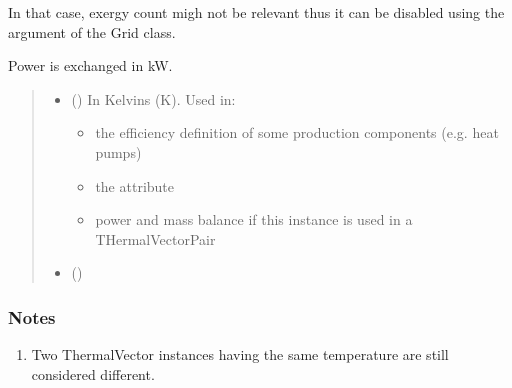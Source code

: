 \documentclass[letterpaper,10pt,english]{sphinxmanual}
\begin{document}
\begin{fulllineitems}
\begin{fulllineitems}
\begin{itemize}
\sphinxAtStartPar
In that case, exergy count migh not be relevant thus it can be disabled using the  argument of the Grid
class.

\end{itemize}

\sphinxAtStartPar
Power is exchanged in kW.
\begin{quote}\begin{description}
\begin{itemize}
\item {} 
\sphinxAtStartPar
{} (\sphinxstyleliteralemphasis{\sphinxupquote{, }}) \textendash{} 
\sphinxAtStartPar
In Kelvins (K).
Used in:
\begin{itemize}
\item {} 
\sphinxAtStartPar
the efficiency definition of some production components (e.g. heat pumps)

\item {} 
\sphinxAtStartPar
the  attribute

\item {} 
\sphinxAtStartPar
power and mass balance if this instance is used in a THermalVectorPair

\end{itemize}


\item {} 
\sphinxAtStartPar
{} (\sphinxstyleliteralemphasis{\sphinxupquote{, }}) \textendash{} 

\end{itemize}

\end{description}\end{quote}
\subsubsection*{Notes}
\begin{enumerate}
%
\item {} 
\sphinxAtStartPar
Two ThermalVector instances having the same temperature are still considered different.


\end{enumerate}
\end{fulllineitems}
\end{fulllineitems}
\end{document}
